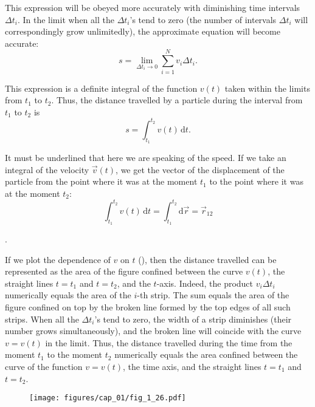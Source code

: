 \noindent
This expression will be obeyed more accurately with diminishing time intervals $\Delta t_i$. In the limit when all the $\Delta t_i$'s tend to zero (the number of intervals $\Delta t_i$ will correspondingly grow unlimitedly), the approximate equation will become accurate:
\begin{equation*}
s = \lim_{\Delta t_i\to 0} \sum_{i=1}^{N} v_i \Delta t_i.
\end{equation*}

This expression is a definite integral of the function $v(t)$ taken within the limits from $t_1$ to $t_2$. Thus, the distance travelled by a particle during the interval from $t_1$ to $t_2$ is
\begin{equation}\label{eq:1_74}
s = \int_{t_1}^{t_2} v(t)\,\mathrm{d}t.
\end{equation}

\noindent
It must be underlined that here we are speaking of the speed. If we take an integral of the velocity $\vec{v}(t)$, we get the vector of the displacement of the particle from the point where it was at the moment $t_1$ to the point where it was at the moment $t_2$:
\begin{equation}\label{eq:1_75}
\int_{t_1}^{t_2} v(t)\,\mathrm{d}t = \int_{t_1}^{t_2} \mathrm{d}\vec{r} = \vec{r}_{12}
\end{equation}

.

If we plot the dependence of $v$ on $t$ (), then the distance travelled can be represented as the area of the figure confined between the curve $v(t)$, the straight lines $t = t_1$ and $t = t_2$, and the $t$-axis. Indeed, the product $v_i\Delta t_i$ numerically equals the area of the $i$-th strip. The sum  equals the area of the figure confined on top by the broken line formed by the top edges of all such strips. When all the $\Delta t_i$'s tend to zero, the width of a strip diminishes (their number grows simultaneously), and the broken line will coincide with the curve $v = v(t)$ in the limit. Thus, the distance travelled during the time from the moment $t_1$ to the moment $t_2$ numerically equals the area confined between the curve of the function $v = v(t)$, the time axis, and the straight lines $t = t_1$ and $t = t_2$. 

\begin{figure}[t]
	\begin{center}
		\texttt{[image: figures/cap\_01/fig\_1\_26.pdf]}
		\caption[]{}
		\label{fig:1_26}
	\end{center}
	\vspace{-0.8cm}
\end{figure}

